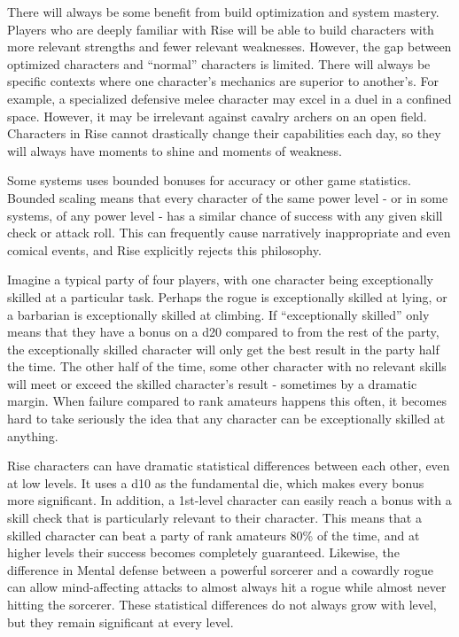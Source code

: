       There will always be some benefit from build optimization and system mastery.
      Players who are deeply familiar with Rise will be able to build characters with more relevant strengths and fewer relevant weaknesses.
      However, the gap between optimized characters and ``normal'' characters is limited.
      There will always be specific contexts where one character's mechanics are superior to another's.
      For example, a specialized defensive melee character may excel in a duel in a confined space.
      However, it may be irrelevant against cavalry archers on an open field.
      Characters in Rise cannot drastically change their capabilities each day, so they will always have moments to shine and moments of weakness.

    Some systems uses bounded bonuses for accuracy or other game statistics.
    Bounded scaling means that every character of the same power level - or in some systems, of any power level - has a similar chance of success with any given skill check or attack roll.
    This can frequently cause narratively inappropriate and even comical events, and Rise explicitly rejects this philosophy.

    Imagine a typical party of four players, with one character being exceptionally skilled at a particular task.
    Perhaps the rogue is exceptionally skilled at lying, or a barbarian is exceptionally skilled at climbing.
    If ``exceptionally skilled'' only means that they have a  bonus on a d20 compared to  from the rest of the party, the exceptionally skilled character will only get the best result in the party half the time.
    The other half of the time, some other character with no relevant skills will meet or exceed the skilled character's result - sometimes by a dramatic margin.
    When failure compared to rank amateurs happens this often, it becomes hard to take seriously the idea that any character can be exceptionally skilled at anything.

    Rise characters can have dramatic statistical differences between each other, even at low levels.
    It uses a d10 as the fundamental die, which makes every bonus more significant.
    In addition, a 1st-level character can easily reach a  bonus with a skill check that is particularly relevant to their character.
    This means that a skilled character can beat a party of rank amateurs 80\% of the time, and at higher levels their success becomes completely guaranteed.
    Likewise, the difference in Mental defense between a powerful sorcerer and a cowardly rogue can allow mind-affecting attacks to almost always hit a rogue while almost never hitting the sorcerer.
    These statistical differences do not always grow with level, but they remain significant at every level.

